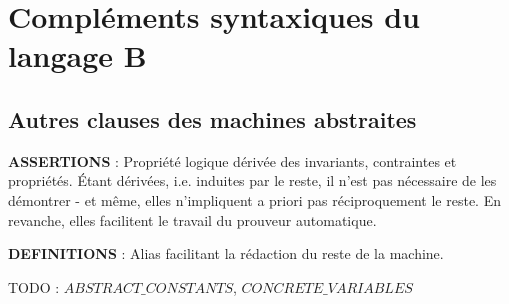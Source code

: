 \documentclass[10pt,a4paper]{article}
\begin{document}
\section{Compléments syntaxiques du langage B}

\subsection{Autres clauses des machines abstraites}

\textbf{ASSERTIONS} : Propriété logique dérivée des invariants, contraintes et propriétés. Étant dérivées, i.e. induites par le reste, il n'est pas nécessaire de les démontrer - et même, elles n'impliquent a priori pas réciproquement le reste. En revanche, elles facilitent le travail du prouveur automatique.

\textbf{DEFINITIONS} : Alias facilitant la rédaction du reste de la machine.

TODO : $ABSTRACT\_CONSTANTS$, $CONCRETE\_VARIABLES$



\end{document}
